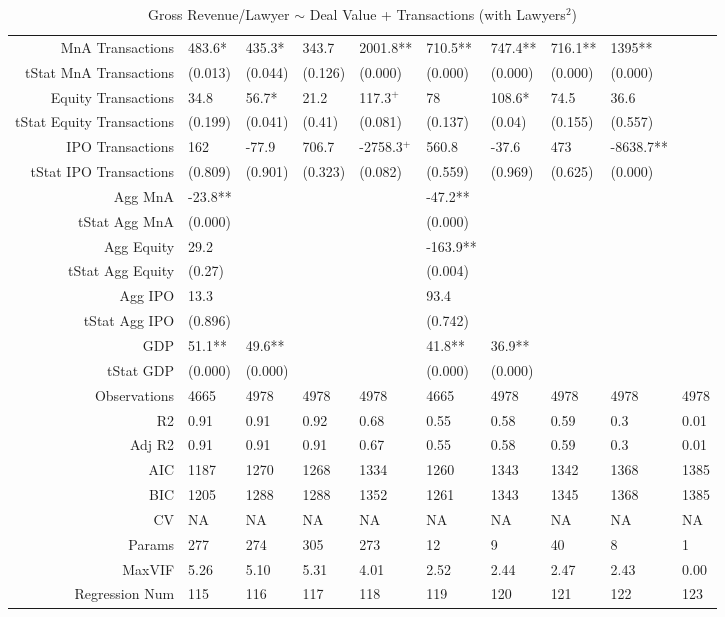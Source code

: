 \begin{table}[ht]
\begin{tabular}{rlllllllll}
  MnA Transactions & 483.6* & 435.3* & 343.7 & 2001.8** & 710.5** & 747.4** & 716.1** & 1395** &  \\ 
  tStat MnA Transactions & (0.013) & (0.044) & (0.126) & (0.000) & (0.000) & (0.000) & (0.000) & (0.000) &  \\ 
  Equity Transactions & 34.8 & 56.7* & 21.2 & 117.3$^{+}$ & 78 & 108.6* & 74.5 & 36.6 &  \\ 
  tStat Equity Transactions & (0.199) & (0.041) & (0.41) & (0.081) & (0.137) & (0.04) & (0.155) & (0.557) &  \\ 
  IPO Transactions & 162 & -77.9 & 706.7 & -2758.3$^{+}$ & 560.8 & -37.6 & 473 & -8638.7** &  \\ 
  tStat IPO Transactions & (0.809) & (0.901) & (0.323) & (0.082) & (0.559) & (0.969) & (0.625) & (0.000) &  \\ 
  Agg MnA & -23.8** &  &  &  & -47.2** &  &  &  &  \\ 
  tStat Agg MnA & (0.000) &  &  &  & (0.000) &  &  &  &  \\ 
  Agg Equity & 29.2 &  &  &  & -163.9** &  &  &  &  \\ 
  tStat Agg Equity & (0.27) &  &  &  & (0.004) &  &  &  &  \\ 
  Agg IPO & 13.3 &  &  &  & 93.4 &  &  &  &  \\ 
  tStat Agg IPO & (0.896) &  &  &  & (0.742) &  &  &  &  \\ 
  GDP & 51.1** & 49.6** &  &  & 41.8** & 36.9** &  &  &  \\ 
  tStat GDP & (0.000) & (0.000) &  &  & (0.000) & (0.000) &  &  &  \\ 
  Observations & 4665 & 4978 & 4978 & 4978 & 4665 & 4978 & 4978 & 4978 & 4978 \\ 
  R2 & 0.91 & 0.91 & 0.92 & 0.68 & 0.55 & 0.58 & 0.59 & 0.3 & 0.01 \\ 
  Adj R2 & 0.91 & 0.91 & 0.91 & 0.67 & 0.55 & 0.58 & 0.59 & 0.3 & 0.01 \\ 
  AIC & 1187 & 1270 & 1268 & 1334 & 1260 & 1343 & 1342 & 1368 & 1385 \\ 
  BIC & 1205 & 1288 & 1288 & 1352 & 1261 & 1343 & 1345 & 1368 & 1385 \\ 
  CV & NA & NA & NA & NA & NA & NA & NA & NA & NA \\ 
  Params & 277 & 274 & 305 & 273 & 12 & 9 & 40 & 8 & 1 \\ 
  MaxVIF & 5.26 & 5.10 & 5.31 & 4.01 & 2.52 & 2.44 & 2.47 & 2.43 & 0.00 \\ 
  Regression Num & 115 & 116 & 117 & 118 & 119 & 120 & 121 & 122 & 123 \\ 
   \hline
\end{tabular}
\caption{Gross Revenue/Lawyer $\sim$ Deal Value + Transactions (with Lawyers$^2$)} 
\end{table}
